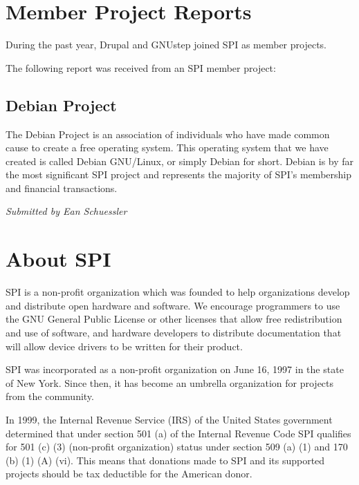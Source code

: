 \documentclass[letterpaper]{report}
\begin{document}
\chapter{Member Project Reports}

During the past year, Drupal and GNUstep joined SPI as member projects.

The following report was received from an SPI member project:

\section{Debian Project}

The Debian Project is an association of individuals who have made common
cause to create a free operating system. This operating system that we have
created is called Debian GNU/Linux, or simply Debian for short. Debian is
by far the most significant SPI project and represents the majority of
SPI's membership and financial transactions.

\emph{Submitted by Ean Schuessler}

\appendix

\chapter{About SPI}

SPI is a non-profit organization which was founded to help organizations
develop and distribute open hardware and software. We encourage programmers
to use the GNU General Public License or other licenses that allow free
redistribution and use of software, and hardware developers to distribute
documentation that will allow device drivers to be written for their
product.

SPI was incorporated as a non-profit organization on June 16, 1997 in the
state of New York. Since then, it has become an umbrella organization for
projects from the community.

In 1999, the Internal Revenue Service (IRS) of the United States government
determined that under section 501 (a) of the Internal Revenue Code SPI
qualifies for 501 (c) (3) (non-profit organization) status under section
509 (a) (1) and 170 (b) (1) (A) (vi). This means that donations made to SPI
and its supported projects should be tax deductible for the American donor.
\end{document}
